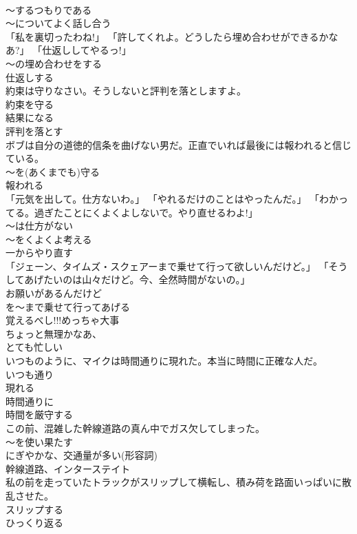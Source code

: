 \documentclass[8pt]{extreport}
\begin{document}
\begin{CJK}{UTF8}{min}
\\	～するつもりである 
\\	～についてよく話し合う
\\	「私を裏切ったわね!」 「許してくれよ。どうしたら埋め合わせができるかなあ?」 「仕返ししてやるっ!」	
\\	～の埋め合わせをする 
\\	仕返しする
\\	約束は守りなさい。そうしないと評判を落としますよ。	
\\	約束を守る 
\\	結果になる 
\\	評判を落とす
\\	ボブは自分の道徳的信条を曲げない男だ。正直でいれば最後には報われると信じている。	
\\	～を(あくまでも)守る 
\\	報われる
\\	「元気を出して。仕方ないわ。」 「やれるだけのことはやったんだ。」 「わかってる。過ぎたことにくよくよしないで。やり直せるわよ!」	
\\	～は仕方がない 
\\	～をくよくよ考える 
\\	一からやり直す
\\	「ジェーン、タイムズ・スクェアーまで乗せて行って欲しいんだけど。」 「そうしてあげたいのは山々だけど。今、全然時間がないの。」	
\\	お願いがあるんだけど 
\\	を～まで乗せて行ってあげる 
\\	覚えるべし!!!めっちゃ大事 
\\	ちょっと無理かなあ、 
\\	とても忙しい
\\	いつものように、マイクは時間通りに現れた。本当に時間に正確な人だ。	
\\	いつも通り 
\\	現れる 
\\	時間通りに 
\\	時間を厳守する
\\	この前、混雑した幹線道路の真ん中でガス欠してしまった。	
\\	～を使い果たす 
\\	にぎやかな、交通量が多い(形容詞) 
\\	幹線道路、インターステイト
\\	私の前を走っていたトラックがスリップして横転し、積み荷を路面いっぱいに散乱させた。	
\\	スリップする 
\\	ひっくり返る

\end{CJK}
\end{document}
